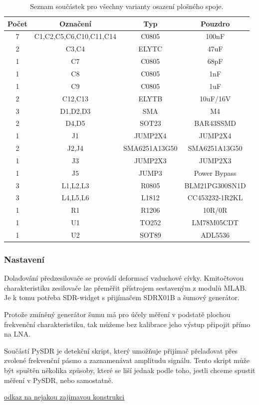 \documentclass[12pt,a4paper,oneside]{article}
\begin{document}
\begin{savenotes}
\begin{table}[h!]
\begin{center}
\begin{tabular}{ |c|c|c|c| }
\hline 
Počet & Označení & Typ  & Pouzdro  \\ 
\hline 
7	&	C1,C2,C5,C6,C10,C11,C14	&	C0805	&	100nF	\\
2	&	C3,C4	&	ELYTC	&	47uF	\\
1	&	C7	&	C0805	&	68pF	\\
1	&	C8	&	C0805	&	1nF	\\
1	&	C9	&	C0805	&	1uF	\\
2	&	C12,C13	&	ELYTB	&	10uF/16V	\\
3	&	D1,D2,D3	&	SMA	&	M4	\\
2	&	D4,D5	&	SOT23	&	BAR43SSMD	\\
1	&	J1	&	JUMP2X4	&	JUMP2X4	\\
2	&	J2,J4	&	SMA6251A13G50	&	SMA6251A13G50	\\
1	&	J3	&	JUMP2X3	&	JUMP2X3	\\
1	&	J5	&	JUMP3	&	Power Bypass	\\
3	&	L1,L2,L3	&	R0805	&	BLM21PG300SN1D	\\
3	&	L4,L5,L6	&	L1812	&	CC453232-1R2KL	\\
1	&	R1	&	R1206	&	10R/0R	\\
1	&	U1	&	TO252	&	LM78M05CDT	\\
1	&	U2	&	SOT89	&	ADL5536	\\
\hline 
\end{tabular}
\end{center}
\caption{Seznam součástek pro všechny varianty osazení plošného spoje.}
\label{seznam_soucastek}
\end{table}
\end{savenotes}

\newpage



\subsubsection{Nastavení}

Dolaďování předzesilovače se provádí deformací vzduchové cívky. Kmitočtovou charakteristiku zesilovače lze přeměřit přístrojem sestaveným z modulů MLAB. Je k tomu potřeba SDR-widget s přijímačem SDRX01B a šumový generátor.

Protože zmíněný generátor šumu má pro účely měření v podstatě plochou frekvenční charakteristiku, tak můžeme bez kalibrace jeho výstup připojit přímo na LNA.

Součástí PySDR je detekční skript, který umožňuje přijímač přelaďovat přes zvolené frekvenční pásmo a zaznamenávat amplitudu signálu. Tento skript může být spuštěn několika způsoby, které se liší jednak podle toho, jestli chceme spustit měření v PySDR, nebo samostatně.


\begin{thebibliography}{99}
\href{http:// odkaz na nejakou zajimavou konstrukci}{odkaz na nejakou zajimavou konstrukci}

\end{thebibliography}
\end{document}
